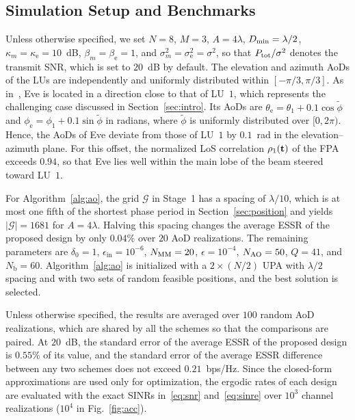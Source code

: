 \documentclass[journal]{IEEEtran}
\newcommand{\rev}[1]{{\color{red}#1}}
\newcommand{\rev}[1]{#1}
\begin{document}
\subsection{Simulation Setup and Benchmarks}\label{sec:sim_setup}

Unless otherwise specified, we set $N=8$, $M=3$, $A=4\lambda$, $D_{\min}=\lambda/2$, $\kappa_m=\kappa_{\mathrm e}=10$~dB, $\beta_m=\beta_{\mathrm e}=1$, and $\sigma_m^2=\sigma_{\mathrm e}^2=\sigma^2$, so that $P_{\mathrm{tot}}/\sigma^2$ denotes the transmit SNR, which is set to $20$~dB by default. The elevation and azimuth AoDs of the LUs are independently and uniformly distributed within $[-\pi/3,\pi/3]$. As in~\cite{ChenArxiv2026}, Eve is located in a direction close to that of LU~$1$, which represents the challenging case discussed in Section~\ref{sec:intro}. Its AoDs are $\theta_{\mathrm e}=\theta_1+0.1\cos\tilde\phi$ and $\phi_{\mathrm e}=\phi_1+0.1\sin\tilde\phi$ in radians, where $\tilde\phi$ is uniformly distributed over $[0,2\pi)$. Hence, the AoDs of Eve deviate from those of LU~$1$ by $0.1$~rad in the elevation--azimuth plane. For this offset, the normalized LoS correlation $\rho_1(\mathbf{t})$ of the FPA exceeds $0.94$, so that Eve lies well within the main lobe of the beam steered toward LU~$1$.

For Algorithm~\ref{alg:ao}, the grid $\mathcal G$ in Stage~1 has a spacing of $\lambda/10$, which is at most one fifth of the shortest phase period in Section~\ref{sec:position} and yields $|\mathcal G|=1681$ for $A=4\lambda$. Halving this spacing changes the average ESSR of the proposed design by only $0.04\%$ over $20$ AoD realizations. The remaining parameters are $\delta_0=1$, $\epsilon_{\mathrm{in}}=10^{-6}$, $N_{\mathrm{MM}}=20$, $\epsilon=10^{-4}$, $N_{\mathrm{AO}}=50$, $Q=41$, and $N_{\mathrm b}=60$. Algorithm~\ref{alg:ao} is initialized with a $2\times(N/2)$ UPA with $\lambda/2$ spacing and with two sets of random feasible positions, and the best solution is selected.

\rev{Unless otherwise specified, the} results are averaged over $100$ random AoD realizations, which are shared by all the schemes so that the comparisons are paired. At $20$~dB, the standard error of the average ESSR of the proposed design is $0.55\%$ of its value, and the standard error of the average ESSR difference between any two schemes does not exceed $0.21$~bps/Hz. Since the closed-form approximations are used only for optimization, the ergodic rates of each design are evaluated with the exact SINRs in~\eqref{eq:snr} and~\eqref{eq:sinre} over $10^3$ channel realizations ($10^4$ in Fig.~\ref{fig:acc}).
\end{document}
